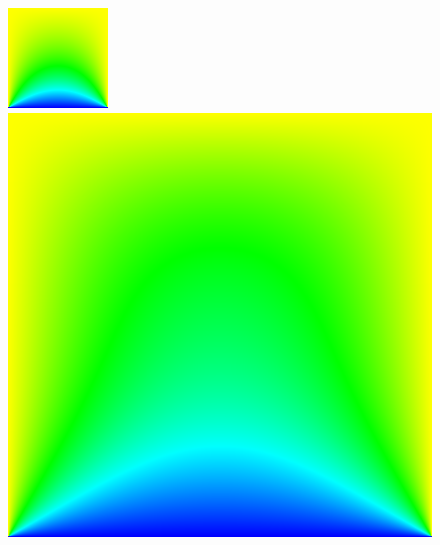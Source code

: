 \documentclass[a4paper]{report}
\begin{document}
\begin{figure}[h]
\centering
\begin{minipage}{.3\textwidth}
  \centering
  \includegraphics[width=.95\linewidth]{images/poisson_gs_100.png}
\end{minipage}%
\begin{minipage}{.3\textwidth}
  \centering
  \includegraphics[width=.95\linewidth]{images/poisson_gs_500.png}

\end{minipage}
\end{figure}
\end{document}
